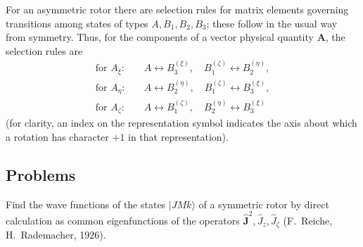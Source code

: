 For an asymmetric rotor there are selection rules for matrix elements governing transitions among states of types $A,B_1,B_2,B_3$; these follow in the usual way from symmetry. Thus, for the components of a vector physical quantity $\mathbf A$, the selection rules are
\begin{equation}
\begin{aligned}
\text{for }A_\xi:&\quad A\leftrightarrow B_3^{(\xi)},\quad B_1^{(\zeta)}\leftrightarrow B_2^{(\eta)},\\
\text{for }A_\eta:&\quad A\leftrightarrow B_2^{(\eta)},\quad B_1^{(\zeta)}\leftrightarrow B_3^{(\xi)},\\
\text{for }A_\zeta:&\quad A\leftrightarrow B_1^{(\zeta)},\quad B_2^{(\eta)}\leftrightarrow B_3^{(\xi)}
\end{aligned} \tag{103.16}
\end{equation}
(for clarity, an index on the representation symbol indicates the axis about which a rotation has character $+1$ in that representation).

\subsection*{Problems}

 Find the wave functions of the states $|JMk\rangle$ of a symmetric rotor by direct calculation as common eigenfunctions of the operators $\hat{\mathbf J}^{2},\hat J_z,\hat J_\zeta$ (F.~Reiche, H.~Rademacher, 1926).

